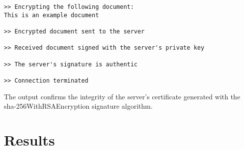 \begin{verbatim}
>> Encrypting the following document:
This is an example document

>> Encrypted document sent to the server

>> Received document signed with the server's private key

>> The server's signature is authentic

>> Connection terminated
\end{verbatim}

The output confirms the integrity of the server's certificate generated with the sha-256WithRSAEncryption signature algorithm.


\section{Results}
